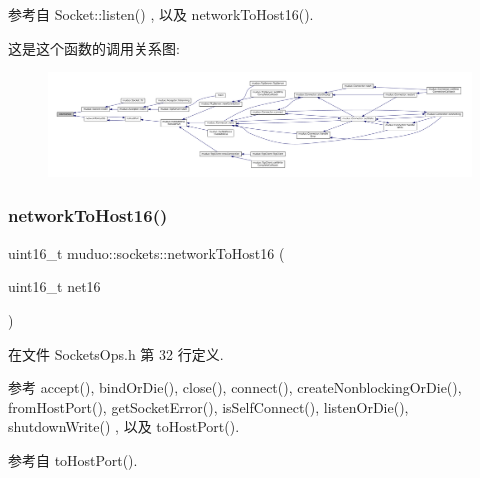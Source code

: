 参考自 Socket\+::listen() , 以及 network\+To\+Host16().

这是这个函数的调用关系图\+:
\nopagebreak
\begin{figure}[H]
\begin{center}
\leavevmode
\includegraphics[width=350pt]{namespacemuduo_1_1sockets_a379cec5f383764a3696d9615bd344529_icgraph}
\end{center}
\end{figure}
\mbox{\label{namespacemuduo_1_1sockets_aeeb31294e44fee5ecfc4b32f420f6d5d}} 
\subsubsection{\texorpdfstring{network\+To\+Host16()}{networkToHost16()}}
{\footnotesize\ttfamily uint16\+\_\+t muduo\+::sockets\+::network\+To\+Host16 (\begin{DoxyParamCaption}\item[{uint16\+\_\+t}]{net16 }\end{DoxyParamCaption})\hspace{0.3cm}{\ttfamily [inline]}}



在文件 Sockets\+Ops.\+h 第 32 行定义.



参考 accept(), bind\+Or\+Die(), close(), connect(), create\+Nonblocking\+Or\+Die(), from\+Host\+Port(), get\+Socket\+Error(), is\+Self\+Connect(), listen\+Or\+Die(), shutdown\+Write() , 以及 to\+Host\+Port().



参考自 to\+Host\+Port().

